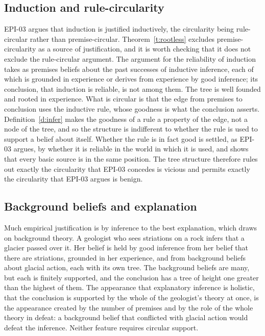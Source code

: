 \documentclass{situationist-preprint}
\begin{document}
\subsection{Induction and rule-circularity}

EPI-03 argues that induction is justified inductively, the circularity being rule-circular rather than premise-circular. Theorem~\ref{t:rootless} excludes premise-circularity as a source of justification, and it is worth checking that it does not exclude the rule-circular argument. The argument for the reliability of induction takes as premises beliefs about the past successes of inductive inference, each of which is grounded in experience or derives from experience by good inference; its conclusion, that induction is reliable, is not among them. The tree is well founded and rooted in experience. What is circular is that the edge from premises to conclusion uses the inductive rule, whose goodness is what the conclusion asserts. Definition~\ref{d:infer} makes the goodness of a rule a property of the edge, not a node of the tree, and so the structure is indifferent to whether the rule is used to support a belief about itself. Whether the rule is in fact good is settled, as EPI-03 argues, by whether it is reliable in the world in which it is used, and \citet{Alston1986} shows that every basic source is in the same position. The tree structure therefore rules out exactly the circularity that EPI-03 concedes is vicious and permits exactly the circularity that EPI-03 argues is benign.

\subsection{Background beliefs and explanation}

Much empirical justification is by inference to the best explanation, which draws on background theory. A geologist who sees striations on a rock infers that a glacier passed over it. Her belief is held by good inference from her belief that there are striations, grounded in her experience, and from background beliefs about glacial action, each with its own tree. The background beliefs are many, but each is finitely supported, and the conclusion has a tree of height one greater than the highest of them. The appearance that explanatory inference is holistic, that the conclusion is supported by the whole of the geologist's theory at once, is the appearance created by the number of premises and by the role of the whole theory in defeat: a background belief that conflicted with glacial action would defeat the inference. Neither feature requires circular support.
\end{document}
